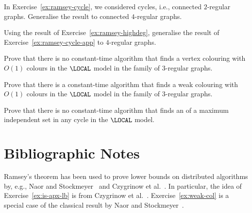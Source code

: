 \begin{ex}\label{ex:ramsey-highdeg}
    In Exercise~\ref{ex:ramsey-cycle}, we considered cycles, i.e., connected $2$-regular graphs. Generalise the result to connected $4$-regular graphs.

\end{ex}

\begin{ex}\label{ex:ramsey-highdeg-app}
    Using the result of Exercise~\ref{ex:ramsey-highdeg}, generalise the result of Exercise~\ref{ex:ramsey-cycle-app} to $4$-regular graphs.
\end{ex}

\begin{ex}
    Prove that there is no constant-time algorithm that finds a vertex colouring with $O(1)$ colours in the $\LOCAL$ model in the family of $3$-regular graphs.

\end{ex}

\begin{exs}\label{ex:weak-col}
    Prove that there is a constant-time algorithm that finds a weak colouring with $O(1)$ colours in the $\LOCAL$ model in the family of $3$-regular graphs.
\end{exs}

\begin{exs}\label{ex:is-apx-lb}
    Prove that there is no constant-time algorithm that finds an  of a maximum independent set in any cycle in the $\LOCAL$ model.
    
\end{exs}


\section{Bibliographic Notes}

Ramsey's theorem has been used to prove lower bounds on distributed algorithms by, e.g., Naor and Stockmeyer~\cite{naor95what} and Czygrinow et al.~\cite{czygrinow08fast}. In particular, the idea of Exercise~\ref{ex:is-apx-lb} is from Czygrinow et al.~\cite{czygrinow08fast}. Exercise~\ref{ex:weak-col} is a special case of the classical result by Naor and Stockmeyer~\cite{naor95what}.
